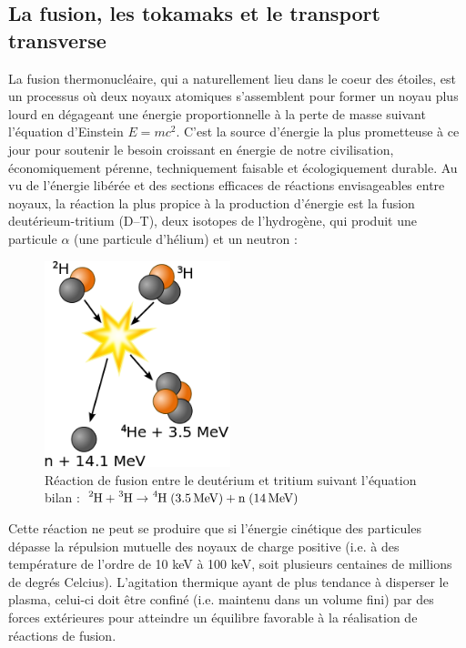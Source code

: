\label{AnnexeA}
\begin{refsection}

\section*{La fusion, les tokamaks et le transport transverse}

La fusion thermonucléaire, qui a naturellement lieu dans le coeur des étoiles,
est un processus où deux noyaux atomiques s'assemblent pour former un noyau
plus lourd en dégageant une énergie proportionnelle à la perte de masse suivant
l'équation d'Einstein $E=mc^2$. C'est la source d'énergie la plus prometteuse
à ce jour pour soutenir le besoin croissant en énergie de notre civilisation,
économiquement pérenne, techniquement faisable et écologiquement durable.
Au vu de l'énergie libérée et des sections efficaces de réactions envisageables
entre noyaux, la réaction la plus propice à la production d'énergie est la
fusion deutérieum-tritium (D--T), deux isotopes de l'hydrogène, qui produit une
particule $\alpha$ (une particule d'hélium) et un neutron :
\begin{figure}[!htbp]
    \centering
	\includegraphics[height=60mm]{figures/1-fusion.png}
	\caption{Réaction
de fusion entre le deutérium et tritium suivant l'équation
bilan : $\ce{^2\text{H}}+\ce{^3\text{H}} \rightarrow
\ce{^4\text{H}}\;(3.5\,\text{MeV})+\text{n}\;(14\,\text{MeV})$}\label{fusionDT}
\end{figure}

Cette réaction ne peut se produire que si l'énergie cinétique des particules
dépasse la répulsion mutuelle des noyaux de charge positive (i.e. à des
température de l'ordre de 10 keV à 100 keV, soit plusieurs centaines de
millions de degrés Celcius). L'agitation thermique ayant de plus tendance à
disperser le plasma, celui-ci doit être confiné (i.e. maintenu dans un volume
fini) par des forces extérieures pour atteindre un équilibre favorable à la
réalisation de réactions de fusion.


\end{refsection}
